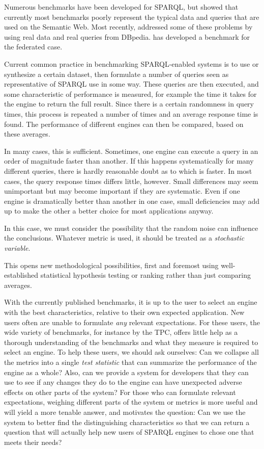 \documentclass{llncs}
\begin{document}
Numerous benchmarks have been developed for SPARQL, but
\cite{Duan:2011:AOC:1989323.1989340} showed that currently most
benchmarks poorly represent the typical data and queries that are used
on the Semantic Web.
Most recently, \cite{mxro:Morsey2011DBpedia} addressed some of these
problems by using real data and real queries from
DBpedia. \cite{Schmidt:2011:FBS:2063016.2063054} has developed a
benchmark for the federated case.

Current common practice in benchmarking SPARQL-enabled systems is to
use or synthesize a certain dataset, then formulate a number of
queries seen as representative of SPARQL use in some way. These
queries are then executed, and some characteristic of performance is
measured, for example the time it takes for the engine to return the
full result. Since there is a certain randomness in query times, this
process is repeated a number of times and an average response time is
found. The performance of different engines can then be compared,
based on these averages.

In many cases, this is sufficient. Sometimes, one engine can execute a
query in an order of magnitude faster than another. If this happens
systematically for many different queries, there is hardly reasonable
doubt as to which is faster. In most cases, the query response times
differs little, however. Small differences may seem unimportant
but may become important if they are systematic. Even if one engine is
dramatically better than another in one case, small deficiencies may
add up to make the other a better choice for most applications anyway.

In this case, we must consider the possibility that the random noise
can influence the conclusions. Whatever metric is used, it should be
treated as a \emph{stochastic variable}.

This opens new methodological possibilities, first and foremost
using well-established statistical hypothesis testing or ranking
rather than just comparing averages.

With the currently published benchmarks, it is up to the user to
select an engine with the best characteristics, relative to their own
expected application. New users often are unable to formulate
\emph{any} relevant expectations. For these users, the wide variety of
benchmarks, for instance by the TPC, offers little help as a thorough
understanding of the benchmarks and what they measure is required to
select an engine. To help these users, we should ask ourselves:
Can we collapse all the metrics into a single \emph{test
  statistic} that can summarize the performance of the engine as a
whole? Also, can we provide a system for developers that they can use
to see if any changes they do to the engine can have unexpected adverse
effects on other parts of the system? For those who can formulate
relevant expectations, weighing different parts of the system or
metrics is more useful and will yield a more tenable answer, and
motivates the question: Can we use the system to better find the
distinguishing characteristics so that we can return a question that
will actually help new users of SPARQL engines to chose one that meets
their needs?
\end{document}
